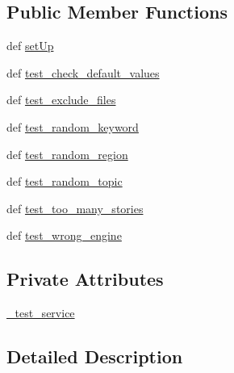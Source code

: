 \subsection*{Public Member Functions}
\begin{DoxyCompactItemize}
\item 
def \hyperlink{classgoogle__news__explorer__test_1_1TestGoogleNewsExplorer_a4085ec66699d458acc19a2aced876eec}{set\-Up}
\item 
def \hyperlink{classgoogle__news__explorer__test_1_1TestGoogleNewsExplorer_acc4e30763c7ccbc6bdf96ac663c335fa}{test\-\_\-check\-\_\-default\-\_\-values}
\item 
def \hyperlink{classgoogle__news__explorer__test_1_1TestGoogleNewsExplorer_ae9376fb33d5ffebe8a086f7d590f6b82}{test\-\_\-exclude\-\_\-files}
\item 
def \hyperlink{classgoogle__news__explorer__test_1_1TestGoogleNewsExplorer_a01c4a3ae82e431d57b75fd44cef4cb8a}{test\-\_\-random\-\_\-keyword}
\item 
def \hyperlink{classgoogle__news__explorer__test_1_1TestGoogleNewsExplorer_acff7232b55ce1d9efe42d7349fe76710}{test\-\_\-random\-\_\-region}
\item 
def \hyperlink{classgoogle__news__explorer__test_1_1TestGoogleNewsExplorer_ad500aebf83d02e202daa74c563ad6cb8}{test\-\_\-random\-\_\-topic}
\item 
def \hyperlink{classgoogle__news__explorer__test_1_1TestGoogleNewsExplorer_a02edc64b9f3496841a4b14e66e26eb8e}{test\-\_\-too\-\_\-many\-\_\-stories}
\item 
def \hyperlink{classgoogle__news__explorer__test_1_1TestGoogleNewsExplorer_ada92920145ea461c953bd8459041f7f7}{test\-\_\-wrong\-\_\-engine}
\end{DoxyCompactItemize}
\subsection*{Private Attributes}
\begin{DoxyCompactItemize}
\item 
\hyperlink{classgoogle__news__explorer__test_1_1TestGoogleNewsExplorer_a017bde9dead67bad3addf7f8e43e11b5}{\-\_\-test\-\_\-service}
\end{DoxyCompactItemize}


\subsection{Detailed Description}


